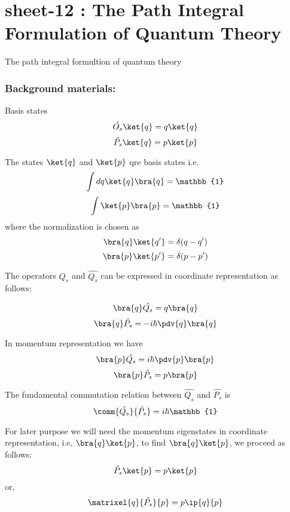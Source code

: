 \chapter{sheet-12 : The Path Integral Formulation of Quantum Theory}
\label{chapter1.path-intigral}

The path integral formultion of quantum theory

\subsection{Background materials:}

Basis states
		\[\hat{O_s} \ket{q} = q \ket{q} \]
		\[\hat{P_s} \ket{q} = p \ket{p} \]
		
	The states {$\ket{q}$} and {$\ket{p}$} qre basis states i.e. \\
	\[\int dq \ket{q}\bra{q} = \mathbb{1} \]
	\[\int \ket{p} \bra{p}  = \mathbb{1} \]
	where the normalization is chosen as 
	\[\bra{q}\ket{q'} = \delta(q-q') \]
	\[\bra{p}\ket{p'} = \delta(p-p') \]
	
	The operators $\hat{Q_s}$ and $\hat{Q_s}$ can be expressed in coordinate representation as follows:
	
	\[\bra{q}\hat{Q_s} = q\bra{q} \]
	\[\bra{q}\hat{P_s} = -i\hbar \pdv{q}  \bra{q} \]
	
	In momentum representation we have 
	\[\bra{p}\hat{Q_s}= i \hbar \pdv{p}\bra{p}   \]
	\[\bra{p}\hat{P_s}= p\bra{p} \]
	
	The fundamental commutation relation between $\hat{Q_s}$ and $\hat{P_s}$ is 
	\[ \comm{\hat{Q_s}}{\hat{P_s}} = i\hbar \mathbb{1} \]
	
	For later purpose we will need the momentum eigenstates in coordinate representation, i.e, $\bra{q}\ket{p}$, to find $\bra{q}\ket{p}$, we proceed as follows:
	\[\hat{P_s}\ket{p} = p\ket{p} \]
	or, \[ \matrixel{q}{\hat{P_s}}{p} = p \ip{q}{p}   \]
	